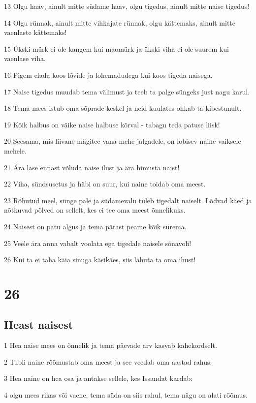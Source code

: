 \par 13 Olgu haav, ainult mitte südame haav, olgu tigedus, ainult mitte naise tigedus!
\par 14 Olgu rünnak, ainult mitte vihkajate rünnak, olgu kättemaks, ainult mitte vaenlaste kättemaks!
\par 15 Ükski mürk ei ole kangem kui maomürk ja ükski viha ei ole suurem kui vaenlase viha.
\par 16 Pigem elada koos lõvide ja lohemadudega kui koos tigeda naisega.
\par 17 Naise tigedus muudab tema välimust ja teeb ta palge süngeks just nagu karul.
\par 18 Tema mees istub oma sõprade keskel ja neid kuulates ohkab ta kibestunult.
\par 19 Kõik halbus on väike naise halbuse kõrval - tabagu teda patuse liisk!
\par 20 Seesama, mis liivane mägitee vana mehe jalgadele, on lobisev naine vaiksele mehele.
\par 21 Ära lase ennast võluda naise ilust ja ära himusta naist!
\par 22 Viha, sündsusetus ja häbi on suur, kui naine toidab oma meest.
\par 23 Rõhutud meel, sünge pale ja südamevalu tuleb tigedalt naiselt. Lõdvad käed ja nõtkuvad põlved on sellelt, kes ei tee oma meest õnnelikuks.
\par 24 Naisest on patu algus ja tema pärast peame kõik surema.
\par 25 Veele ära anna vabalt voolata ega tigedale naisele sõnavoli!
\par 26 Kui ta ei taha käia sinuga käsikäes, siis lahuta ta oma ihust!

\chapter{26}

\section*{Heast naisest}

\par 1 Hea naise mees on õnnelik ja tema päevade arv kasvab kahekordselt.
\par 2 Tubli naine rõõmustab oma meest ja see veedab oma aastad rahus.
\par 3 Hea naine on hea osa ja antakse sellele, kes Issandat kardab:
\par 4 olgu mees rikas või vaene, tema süda on siis rahul, tema nägu on alati rõõmus.


